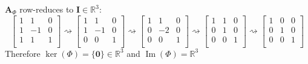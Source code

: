 \documentclass[11pt]{article}
\newcommand{\R}{\mathbb{R}}
\newcommand{\mat}[1]{\mathbf{#1}}   %
\newcommand{\vect}[1]{\bm{#1}}      %
\DeclareMathOperator{\Img}{Im}
\theoremstyle{definition}
\theoremstyle{plain}
\theoremstyle{remark}
\begin{document}
\begin{enumerate}
\begin{enumerate}
                    $\mat{A}_\Phi$ row-reduces to $\mat{I} \in \R^3$:
                    \[
                        \begin{bmatrix}
                            1 & 1  & 0 \\
                            1 & -1 & 0 \\
                            1 & 1  & 1 \\
                        \end{bmatrix}
                        \rightsquigarrow
                        \begin{bmatrix}
                            1 & 1  & 0 \\
                            1 & -1 & 0 \\
                            0 & 0  & 1 \\
                        \end{bmatrix}
                        \rightsquigarrow
                        \begin{bmatrix}
                            1 & 1  & 0 \\
                            0 & -2 & 0 \\
                            0 & 0  & 1 \\
                        \end{bmatrix}
                        \rightsquigarrow
                        \begin{bmatrix}
                            1 & 1 & 0 \\
                            0 & 1 & 0 \\
                            0 & 0 & 1 \\
                        \end{bmatrix}
                        \rightsquigarrow
                        \begin{bmatrix}
                            1 & 0 & 0 \\
                            0 & 1 & 0 \\
                            0 & 0 & 1 \\
                        \end{bmatrix}
                    \]
                    Therefore $\ker(\Phi) = \{ \vect{0} \} \in \R^3$ and $\Img(\Phi) = \R^3$


\end{enumerate}
\end{enumerate}
\end{document}
